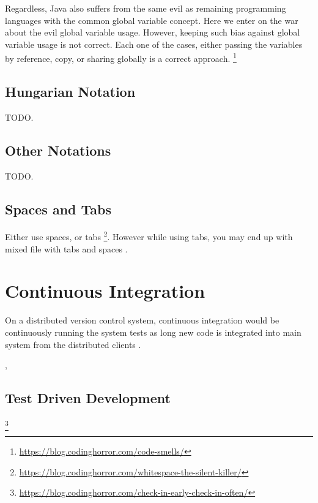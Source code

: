     Regardless, Java also suffers from the same evil as remaining programming
    languages with the common global variable concept. Here we enter on the
    war about the evil global variable usage. However, keeping such bias against
    global variable usage is not correct. Each one of the cases, either passing
    the variables by reference, copy, or sharing globally is a correct approach.
    \footnote{\url{https://blog.codinghorror.com/code-smells/}}


    \subsection{Hungarian Notation}

    TODO.


    \subsection{Other Notations}

    TODO.


    \subsection{Spaces and Tabs}

    Either use spaces, or tabs
    \footnote{\url{https://blog.codinghorror.com/whitespace-the-silent-killer/}}.
    However while using tabs,
    you may end up with mixed file with tabs and spaces \cite{tabsAndSpacesConversion}.



    \section{Continuous Integration}

    On a distributed version control system,
    continuous integration would be continuously running the system tests
    as long new code is integrated into main system
    from the distributed clients \cite{continuousIntegration}.

    ,


    \subsection{Test Driven Development}


    \footnote{\url{https://blog.codinghorror.com/check-in-early-check-in-often/}}

    \cite{aspectOriented}



